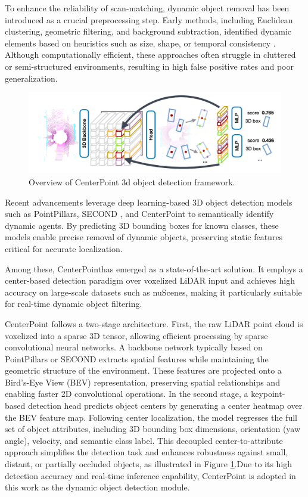 To enhance the reliability of scan-matching, dynamic object removal has been introduced as a crucial preprocessing step. Early methods, including Euclidean clustering, geometric filtering, and background subtraction, identified dynamic elements based on heuristics such as size, shape, or temporal consistency \cite{liu2019segmentation,koide2019portable} . Although computationally efficient, these approaches often struggle in cluttered or semi-structured environments, resulting in high false positive rates and poor generalization.
\begin{figure}
	\centering
	\includegraphics[width=1
	\linewidth]{images/center_point2.png}
	\caption{Overview of CenterPoint 3d object detection framework.  \cite{yin2021center}}
	\label{fig:Overview-CenterPoint }
\end{figure}
Recent advancements leverage deep learning-based 3D object detection models such as PointPillars\cite{lang2019pointpillars}, SECOND \cite{yan2018second}, and CenterPoint \cite{yin2021center} to semantically identify dynamic agents. By predicting 3D bounding boxes for known classes, these models enable precise removal of dynamic objects, preserving static features critical for accurate localization.

Among these, CenterPoint\cite{yin2021center}has emerged as a state-of-the-art solution. It employs a center-based detection paradigm over voxelized LiDAR input and achieves high accuracy on large-scale datasets such as nuScenes\cite{caesar2020nuscenes}, making it particularly suitable for real-time dynamic object filtering.

CenterPoint follows a two-stage architecture\cite{yin2021center}. First, the raw LiDAR point cloud is voxelized into a sparse 3D tensor, allowing efficient processing by sparse convolutional neural networks. A backbone network typically based on PointPillars \cite{lang2019pointpillars} or SECOND\cite{yan2018second} extracts spatial features while maintaining the geometric structure of the environment. These features are projected onto a Bird’s-Eye View (BEV) representation, preserving spatial relationships and enabling faster 2D convolutional operations. In the second stage, a keypoint-based detection head predicts object centers by generating a center heatmap over the BEV feature map. Following center localization, the model regresses the full set of object attributes, including 3D bounding box dimensions, orientation (yaw angle), velocity, and semantic class label. This decoupled center-to-attribute approach simplifies the detection task and enhances robustness against small, distant, or partially occluded objects, as illustrated in Figure \ref{fig:Overview-CenterPoint }.Due to its high detection accuracy and real-time inference capability, CenterPoint is adopted in this work as the dynamic object detection module.



